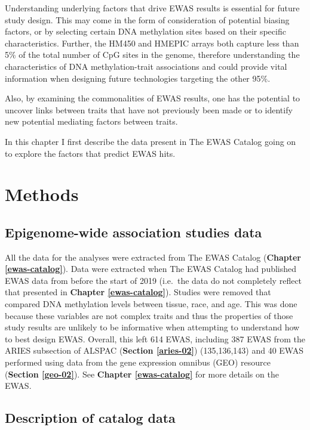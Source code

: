 \documentclass[11pt,oneside]{bristolthesis}
\begin{document}
Understanding underlying factors that drive EWAS results is essential for future study design. This may come in the form of consideration of potential biasing factors, or by selecting certain DNA methylation sites based on their specific characteristics. Further, the HM450 and HMEPIC arrays both capture less than 5\% of the total number of CpG sites in the genome, therefore understanding the characteristics of DNA methylation-trait associations and could provide vital information when designing future technologies targeting the other 95\%.

Also, by examining the commonalities of EWAS results, one has the potential to uncover links between traits that have not previously been made or to identify new potential mediating factors between traits.

In this chapter I first describe the data present in The EWAS Catalog going on to explore the factors that predict EWAS hits.

\newpage

\hypertarget{methods-04}{%
\section{Methods}\label{methods-04}}

\hypertarget{ewas-data-04}{%
\subsection{Epigenome-wide association studies data}\label{ewas-data-04}}

All the data for the analyses were extracted from The EWAS Catalog (\textbf{Chapter \ref{ewas-catalog}}). Data were extracted when The EWAS Catalog had published EWAS data from before the start of 2019 (i.e.~the data do not completely reflect that presented in \textbf{Chapter \ref{ewas-catalog}}). Studies were removed that compared DNA methylation levels between tissue, race, and age. This was done because these variables are not complex traits and thus the properties of those study results are unlikely to be informative when attempting to understand how to best design EWAS. Overall, this left 614 EWAS, including 387 EWAS from the ARIES subsection of ALSPAC (\textbf{Section \ref{aries-02}}) (135,136,143) and 40 EWAS performed using data from the gene expression omnibus (GEO) resource (\textbf{Section \ref{geo-02}}). See \textbf{Chapter \ref{ewas-catalog}} for more details on the EWAS.

\hypertarget{description-of-data}{%
\subsection*{Description of catalog data}\label{description-of-data}}
\end{document}

